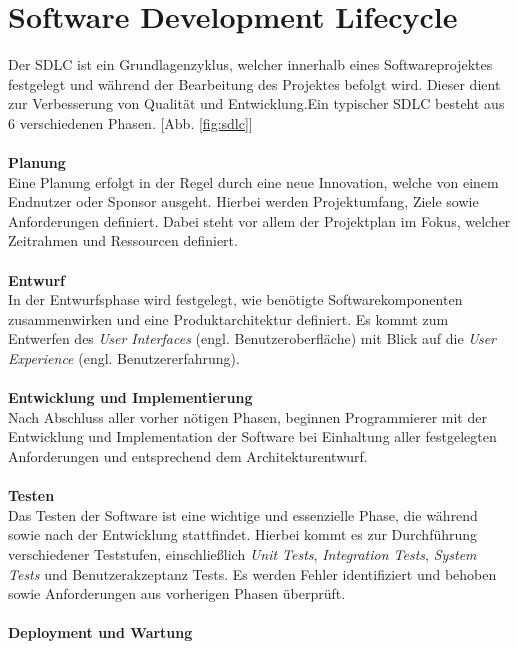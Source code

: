 \section{Software Development Lifecycle}
Der SDLC ist ein Grundlagenzyklus, welcher innerhalb eines Softwareprojektes festgelegt und während der Bearbeitung des Projektes befolgt wird. \cite*{SoftwareDevelopmentLife} Dieser dient zur Verbesserung von Qualität und Entwicklung.Ein typischer SDLC besteht aus 6 verschiedenen Phasen. [Abb. \ref{fig:sdlc}]\\\\
\textbf{Planung}\\[0.2cm]
Eine Planung erfolgt in der Regel durch eine neue Innovation, welche von einem Endnutzer oder Sponsor ausgeht. \cite*{tikySoftwareDevelopmentLife} Hierbei werden Projektumfang, Ziele sowie Anforderungen definiert. Dabei steht vor allem der Projektplan im Fokus, welcher Zeitrahmen und Ressourcen definiert. \cite*{hossainSoftwareDevelopmentLife2023}\\\\
\textbf{Entwurf}\\[0.2cm]
In der Entwurfsphase wird festgelegt, wie benötigte Softwarekomponenten zusammenwirken und eine Produktarchitektur definiert. Es kommt zum Entwerfen des \textit{User Interfaces} (engl. Benutzeroberfläche) mit Blick auf die \textit{User Experience} (engl. Benutzererfahrung). \cite*{hossainSoftwareDevelopmentLife2023}\\\\
\textbf{Entwicklung und Implementierung}\\[0.2cm]
Nach Abschluss aller vorher nötigen Phasen, beginnen Programmierer mit der Entwicklung und Implementation der Software bei Einhaltung aller festgelegten Anforderungen und entsprechend dem Architekturentwurf. \cite*{tikySoftwareDevelopmentLife} \\\\
\textbf{Testen}\\[0.2cm]
Das Testen der Software ist eine wichtige und essenzielle Phase, die während sowie nach der Entwicklung stattfindet. Hierbei kommt es zur Durchführung verschiedener Teststufen, einschließlich \textit{Unit Tests}, \textit{Integration Tests}, \textit{System Tests} und Benutzerakzeptanz Tests. Es werden Fehler identifiziert und behoben sowie Anforderungen aus vorherigen Phasen überprüft. \cite*{hossainSoftwareDevelopmentLife2023}\\\\
\textbf{Deployment und Wartung}\\[0.2cm]

